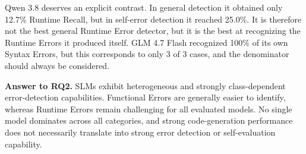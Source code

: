 Qwen 3.8 deserves an explicit contrast. In general detection it obtained only 12.7\% Runtime Recall, but in self-error detection it reached 25.0\%. It is therefore not the best general Runtime Error detector, but it is the best at recognizing the Runtime Errors it produced itself. GLM 4.7 Flash recognized 100\% of its own Syntax Errors, but this corresponds to only 3 of 3 cases, and the denominator should always be considered.

\textbf{Answer to RQ2.} SLMs exhibit heterogeneous and strongly class-dependent error-detection capabilities. Functional Errors are generally easier to identify, whereas Runtime Errors remain challenging for all evaluated models. No single model dominates across all categories, and strong code-generation performance does not necessarily translate into strong error detection or self-evaluation capability.
